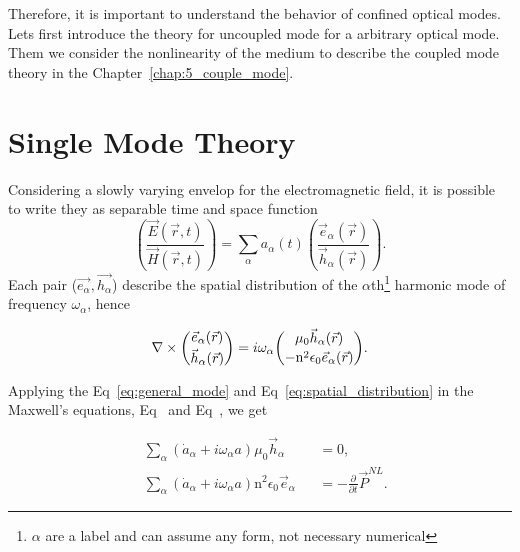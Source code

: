 Therefore, it is important to understand the behavior of confined optical modes. Lets first introduce the theory for uncoupled mode for a arbitrary optical mode. Them we consider the nonlinearity of the medium to describe the coupled mode theory in the Chapter~\ref{chap:5_couple_mode}. 

\section{Single Mode Theory}
\label{sec:single_mode}

Considering a slowly varying envelop for the electromagnetic field, it is possible to write they as separable time and space function
\begin{equation}
    \genfrac{(}{)}{0 pt}{}{\vec{E}(\vec{r},t)}{\vec{H}(\vec{r},t)} = \sum_\alpha a_\alpha(t)\genfrac{(}{)}{0 pt}{}{\vec{e}_\alpha(\vec{r})}{\vec{h}_\alpha(\vec{r})}.
    \label{eq:general_mode}
\end{equation}
Each pair ($\vec{e_\alpha},\vec{h_\alpha}$) describe the spatial distribution of the $\alpha$th\footnote{$\alpha$ are a label and can assume any form, not necessary numerical} harmonic mode of frequency $\omega_\alpha$, hence 

\begin{equation}
    \nabla \times \genfrac{(}{)}{0 pt}{}{\vec{e}_\alpha(\vec{r})}{\vec{h}_\alpha(\vec{r})} = i\omega_\alpha \genfrac{(}{)}{0 pt}{}{\mu_0\vec{h}_\alpha(\vec{r})}{-\n^2\epsilon_0\vec{e}_\alpha(\vec{r})}.
    \label{eq:spatial_distribution}
\end{equation}

Applying the Eq~\ref{eq:general_mode} and Eq~\ref{eq:spatial_distribution} in the Maxwell's equations, Eq~ and Eq~, we get

\begin{subequations}
    \begin{alignat}{2}
        &\sum_\alpha \left(\dot{a}_\alpha + i \omega_\alpha a\right) \mu_0 \vec{h}_\alpha &&= 0,\\
        &\sum_\alpha \left(\dot{a}_\alpha + i \omega_\alpha a\right) \text{n}^2\epsilon_0 \vec{e}_\alpha &&= -\frac{\partial}{\partial t}\vec{P}^{NL}.
    \end{alignat}
\end{subequations}


